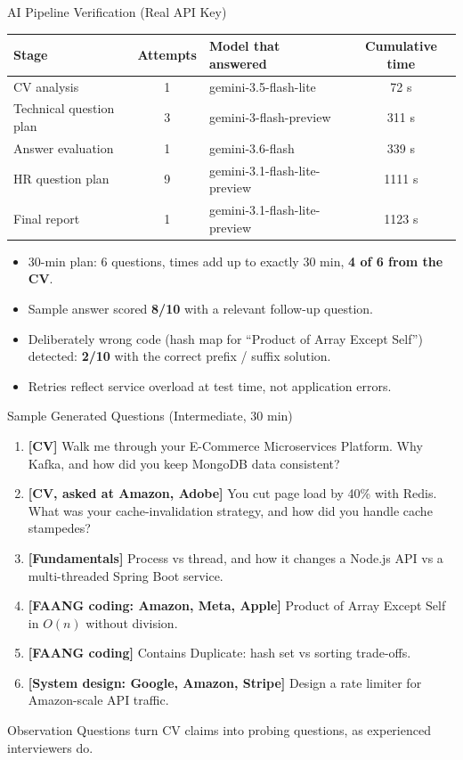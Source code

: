 \documentclass[aspectratio=169,11pt,xcolor=table]{beamer}
\begin{document}
\begin{frame}{AI Pipeline Verification (Real API Key)}
  \small
  \begin{tabularx}{\textwidth}{@{}lcYc@{}}
    \toprule
    \textbf{Stage} & \textbf{Attempts} & \textbf{Model that answered} & \textbf{Cumulative time} \\
    \midrule
    CV analysis & 1 & gemini-3.5-flash-lite & 72 s \\
    Technical question plan & 3 & gemini-3-flash-preview & 311 s \\
    Answer evaluation & 1 & gemini-3.6-flash & 339 s \\
    HR question plan & 9 & gemini-3.1-flash-lite-preview & 1111 s \\
    Final report & 1 & gemini-3.1-flash-lite-preview & 1123 s \\
    \bottomrule
  \end{tabularx}
  \vspace{0.3cm}
  \begin{itemize}
    \item 30-min plan: 6 questions, times add up to exactly 30 min, \textbf{4 of 6 from the CV}.
    \item Sample answer scored \textbf{8/10} with a relevant follow-up question.
    \item Deliberately wrong code (hash map for ``Product of Array Except Self'') detected: \textbf{2/10} with the correct prefix / suffix solution.
    \item Retries reflect service overload at test time, not application errors.
  \end{itemize}
\end{frame}

\begin{frame}{Sample Generated Questions (Intermediate, 30 min)}
  \small
  \begin{enumerate}
    \item \textbf{[CV]} Walk me through your E-Commerce Microservices Platform. Why Kafka, and how did you keep MongoDB data consistent?
    \item \textbf{[CV, asked at Amazon, Adobe]} You cut page load by 40\% with Redis. What was your cache-invalidation strategy, and how did you handle cache stampedes?
    \item \textbf{[Fundamentals]} Process vs thread, and how it changes a Node.js API vs a multi-threaded Spring Boot service.
    \item \textbf{[FAANG coding: Amazon, Meta, Apple]} Product of Array Except Self in $O(n)$ without division.
    \item \textbf{[FAANG coding]} Contains Duplicate: hash set vs sorting trade-offs.
    \item \textbf{[System design: Google, Amazon, Stripe]} Design a rate limiter for Amazon-scale API traffic.
  \end{enumerate}
  \vspace{0.2cm}
  \begin{exampleblock}{Observation}
    Questions turn CV claims into probing questions, as experienced interviewers do.
  \end{exampleblock}
\end{frame}
\end{document}

